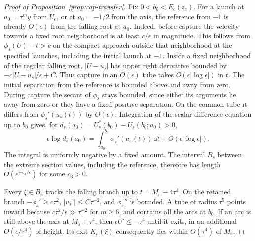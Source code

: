 \begin{proof}[Proof of Proposition~\ref{prop:cap-transfer}]
Fix $0<b_0<E_c(z_e)$. For a launch at $a_0=\tau^m y$ from $U_e$, or
at $a_0=-1/2$ from the axis, the reference from $-1$ is already
$O(\epsilon)$ from the falling root at $a_0$. Indeed, before capture
the velocity towards a fixed root neighborhood is at least $c/\epsilon$
in magnitude. This follows from $\phi_s(U)-t>c$ on the compact
approach outside that neighborhood at the specified launches, including
the initial launch at $-1$. Inside a fixed neighborhood of the regular
falling root, $|U-u_s|$ has upper right derivative bounded by
$-c|U-u_s|/\epsilon+C$. Thus capture in an $O(\epsilon)$ tube takes
$O(\epsilon|\log\epsilon|)$ in $t$. The initial separation from the
reference is bounded above and away from zero. During capture the
secant of $\phi_s$ stays bounded, since either its arguments lie away
from zero or they have a fixed positive separation. On the common tube
it differs from $\phi_s'(u_s(t))$ by $O(\epsilon)$. Integration of the
scalar difference equation up to $b_0$ gives, for
$d_s(a_0)=U_s^*(b_0)-U_s(b_0;a_0)>0$,
\begin{equation}\label{eq:entry-distortion}
 \epsilon\log d_s(a_0)
 =\int_{a_0}^{b_0}\phi_s'(u_s(t))\,\dd t+O(\epsilon|\log\epsilon|).
\end{equation}
The integral is uniformly negative by a fixed amount. The interval
$B_s$ between the extreme section values, including the reference,
therefore has length $O(e^{-c_3/\epsilon})$ for some $c_3>0$.

Every $\xi\in B_s$ tracks the falling branch up to $t=M_s-4\tau^4$.
On the retained branch $-\phi_s'\ge c\tau^2$, $|u_s'|\le C\tau^{-2}$,
and $\phi_s''$ is bounded. A tube of radius $\tau^5$ points inward
because $c\tau^7/\epsilon\gg\tau^{-2}$ for $m\ge6$, and contains all
the arcs at $b_0$. If an arc is still above the axis at $M_s+\tau^4$,
then $\epsilon U'\le-\tau^4$ until it exits, in an additional
$O(\epsilon/\tau^4)$ of height. Its exit $K_s(\xi)$ consequently lies
within $O(\tau^4)$ of $M_s$.


\end{proof}
